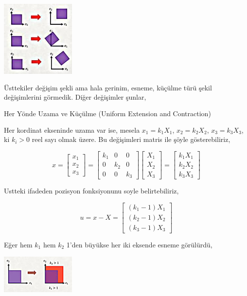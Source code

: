 \documentclass[12pt,fleqn]{article}\usepackage{../../common}
\begin{document}
\includegraphics[width=10em]{phy_020_strs_01_04.jpg}

Üsttekiler değişim şekli ama hala gerinim, esneme, küçülme türü şekil
değişimlerini görmedik. Diğer değişimler şunlar,

Her Yönde Uzama ve Küçülme (Uniform Extension and Contraction)

Her kordinat ekseninde uzama var ise, mesela $x_1 = k_1 X_1$, $x_2 = k_2 X_2$,
$x_3 = k_3 X_3$, ki $k_i > 0$ reel sayı olmak üzere. Bu değişimleri matris
ile şöyle gösterebiliriz,

$$
x = \left[\begin{array}{c}
x_1 \\ x_2 \\ x_3
\end{array}\right] =
\left[\begin{array}{ccc}
k_1 & 0   &   0 \\
0   & k_2 & 0 \\
0   & 0   & k_3
\end{array}\right]
\left[\begin{array}{c}
X_1 \\ X_2 \\ X_3 
\end{array}\right] =
\left[\begin{array}{c}
k_1 X_1 \\ k_2 X_2 \\ k_3 X_3 
\end{array}\right]
$$

Ustteki ifadeden pozisyon fonksiyonunu soyle belirtebiliriz,

$$
u = x - X = \left[\begin{array}{ccc}
(k_1 - 1) X_1 \\ 
(k_2 - 1) X_2 \\ 
(k_3 - 1) X_3 
\end{array}\right]
$$

Eğer hem $k_1$ hem $k_2$ 1'den büyükse her iki eksende esneme görülürdü,

\includegraphics[width=10em]{phy_020_strs_01_06.jpg}
\end{document}
